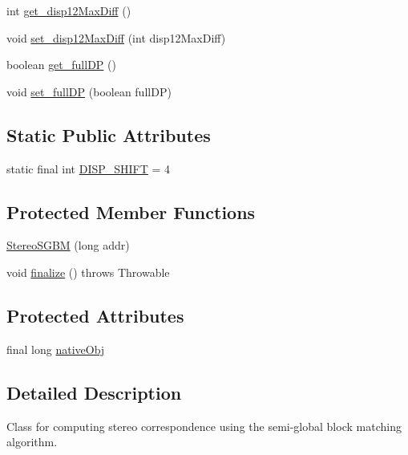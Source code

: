 \begin{DoxyCompactItemize}
\item 
int \mbox{\hyperlink{classorg_1_1opencv_1_1calib3d_1_1_stereo_s_g_b_m_a081f3cc67c33267b40bfc2321dd83308}{get\+\_\+disp12\+Max\+Diff}} ()
\item 
void \mbox{\hyperlink{classorg_1_1opencv_1_1calib3d_1_1_stereo_s_g_b_m_a00faa64db673cb64ddffa4f169d7805c}{set\+\_\+disp12\+Max\+Diff}} (int disp12\+Max\+Diff)
\item 
boolean \mbox{\hyperlink{classorg_1_1opencv_1_1calib3d_1_1_stereo_s_g_b_m_a0b5af6df740997d03aca69344f264521}{get\+\_\+full\+DP}} ()
\item 
void \mbox{\hyperlink{classorg_1_1opencv_1_1calib3d_1_1_stereo_s_g_b_m_a1d1c49b60a4692d0563355d45a37f8fd}{set\+\_\+full\+DP}} (boolean full\+DP)
\end{DoxyCompactItemize}
\subsection*{Static Public Attributes}
\begin{DoxyCompactItemize}
\item 
static final int \mbox{\hyperlink{classorg_1_1opencv_1_1calib3d_1_1_stereo_s_g_b_m_a1d3c5b2bb3f05021a585d266dd38c656}{D\+I\+S\+P\+\_\+\+S\+H\+I\+FT}} = 4
\end{DoxyCompactItemize}
\subsection*{Protected Member Functions}
\begin{DoxyCompactItemize}
\item 
\mbox{\hyperlink{classorg_1_1opencv_1_1calib3d_1_1_stereo_s_g_b_m_a8190d219547330a1e28ac4a3ab36eece}{Stereo\+S\+G\+BM}} (long addr)
\item 
void \mbox{\hyperlink{classorg_1_1opencv_1_1calib3d_1_1_stereo_s_g_b_m_a31d4b7814133695eaf174926fc74693b}{finalize}} ()  throws Throwable 
\end{DoxyCompactItemize}
\subsection*{Protected Attributes}
\begin{DoxyCompactItemize}
\item 
final long \mbox{\hyperlink{classorg_1_1opencv_1_1calib3d_1_1_stereo_s_g_b_m_acec9846fe05a91e3efbad5519ba723d8}{native\+Obj}}
\end{DoxyCompactItemize}


\subsection{Detailed Description}
Class for computing stereo correspondence using the semi-\/global block matching algorithm.

